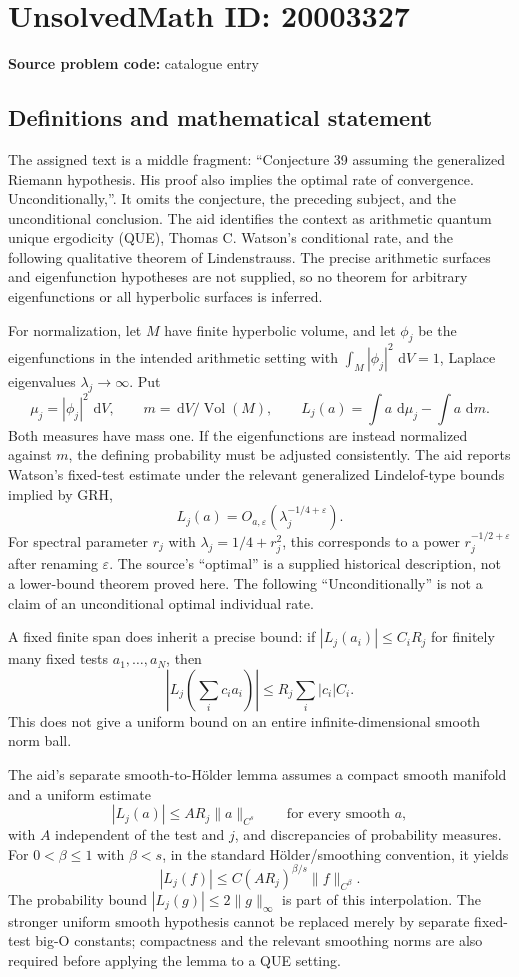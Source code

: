 \documentclass[11pt]{article}
\newcommand{\dd}{\,\mathrm{d}}
\begin{document}
\section*{UnsolvedMath ID: 20003327}
\textbf{Source problem code:} catalogue entry
\subsection{Definitions and mathematical statement}
The assigned text is a middle fragment: ``Conjecture 39 assuming the generalized Riemann hypothesis. His proof also implies the optimal rate of convergence. Unconditionally,''. It omits the conjecture, the preceding subject, and the unconditional conclusion. The aid identifies the context as arithmetic quantum unique ergodicity (QUE), Thomas C. Watson's conditional rate, and the following qualitative theorem of Lindenstrauss. The precise arithmetic surfaces and eigenfunction hypotheses are not supplied, so no theorem for arbitrary eigenfunctions or all hyperbolic surfaces is inferred.

For normalization, let \(M\) have finite hyperbolic volume, and let \(\phi_j\) be the eigenfunctions in the intended arithmetic setting with \(\int_M|\phi_j|^2\,\dd V=1\), Laplace eigenvalues \(\lambda_j\to\infty\). Put
\[
 \mu_j=|\phi_j|^2\,\dd V,\qquad m=\dd V/\operatorname{Vol}(M),\qquad
 L_j(a)=\int a\,\dd\mu_j-\int a\,\dd m.
\]
Both measures have mass one. If the eigenfunctions are instead normalized against \(m\), the defining probability must be adjusted consistently. The aid reports Watson's fixed-test estimate under the relevant generalized Lindelof-type bounds implied by GRH,
\[
 L_j(a)=O_{a,\varepsilon}(\lambda_j^{-1/4+\varepsilon}).
\]
For spectral parameter \(r_j\) with \(\lambda_j=1/4+r_j^2\), this corresponds to a power \(r_j^{-1/2+\varepsilon}\) after renaming \(\varepsilon\). The source's ``optimal'' is a supplied historical description, not a lower-bound theorem proved here. The following ``Unconditionally'' is not a claim of an unconditional optimal individual rate.

A fixed finite span does inherit a precise bound: if \(|L_j(a_i)|\leq C_iR_j\) for finitely many fixed tests \(a_1,\ldots,a_N\), then
\[
 \left|L_j\!\left(\sum_i c_ia_i\right)\right|
 \leq R_j\sum_i|c_i|C_i.
\]
This does not give a uniform bound on an entire infinite-dimensional smooth norm ball.

The aid's separate smooth-to-H\"older lemma assumes a compact smooth manifold and a uniform estimate
\[
 |L_j(a)|\leq A R_j\|a\|_{C^s}\qquad\text{for every smooth }a,
\]
with \(A\) independent of the test and \(j\), and discrepancies of probability measures. For \(0<\beta\leq1\) with \(\beta<s\), in the standard H\"older/smoothing convention, it yields
\[
 |L_j(f)|\leq C(AR_j)^{\beta/s}\|f\|_{C^\beta}.
\]
The probability bound \(|L_j(g)|\leq2\|g\|_\infty\) is part of this interpolation. The stronger uniform smooth hypothesis cannot be replaced merely by separate fixed-test big-O constants; compactness and the relevant smoothing norms are also required before applying the lemma to a QUE setting.
\end{document}
